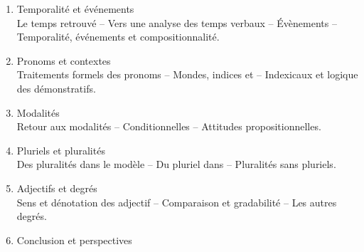 \begin{refsection}
\begin{enumerate}[start=7]
\item Temporalité et événements\\
{\small Le temps retrouvé -- Vers une analyse des temps verbaux -- Évènements --  Temporalité, événements et compositionnalité.}
\item Pronoms et contextes\\
{\small Traitements formels des pronoms -- Mondes, indices et {\LOz} -- Indexicaux et logique des démonstratifs.}
\item Modalités\\
{\small Retour aux modalités -- Conditionnelles -- Attitudes propositionnelles.}
\item Pluriels et pluralités\\
{\small Des pluralités dans le modèle -- Du pluriel dans {\LO} -- Pluralités sans pluriels.}
\item Adjectifs et degrés\\
{\small Sens et dénotation des adjectif -- Comparaison et gradabilité %
-- Les autres degrés.}
\item Conclusion et perspectives
\end{enumerate}


\printbibliography[heading=subbibliography]
\end{refsection}


